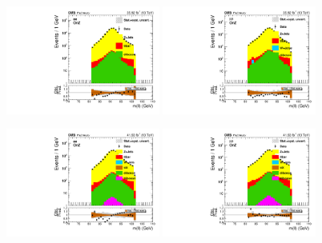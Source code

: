 \begin{figure}[htbp]
  \centering

  \includegraphics[width=0.45\textwidth]{figures/2016/BeforeNormSF_ZCand_Mass_HNWR_SingleElectron_OnZ.pdf}
  \hspace{0.01\textwidth}
  \includegraphics[width=0.45\textwidth]{figures/2016/BeforeNormSF_ZCand_Mass_HNWR_SingleMuon_OnZ.pdf}
  \vspace{0.01\textwidth}

  \includegraphics[width=0.45\textwidth]{figures/2017/BeforeNormSF_ZCand_Mass_HNWR_SingleElectron_OnZ.pdf}
  \hspace{0.01\textwidth}
  \includegraphics[width=0.45\textwidth]{figures/2017/BeforeNormSF_ZCand_Mass_HNWR_SingleMuon_OnZ.pdf}
  \vspace{0.01\textwidth}


\end{figure}
